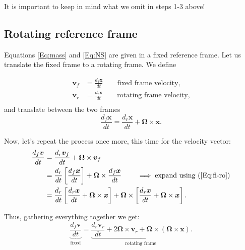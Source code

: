 It is important to keep in mind what we omit in steps 1-3 above!

\subsection{Rotating reference frame}
Equations \ref{Eq:mass} and \ref{Eq:NS} are given in a fixed reference frame. Let us translate the fixed frame to a rotating frame. We define

\begin{equation}
\begin{aligned}
\boldsymbol{v}_f &= \frac{d_f\boldsymbol{x}}{dt} \qquad \text{fixed frame velocity,}\\
\boldsymbol{v}_r &= \frac{d_r\boldsymbol{x}}{dt} \qquad \text{rotating frame velocity,}\\
\end{aligned}
\end{equation}
and translate between the two frames
\begin{equation}
\frac{d_f\boldsymbol{x}}{dt} = \frac{d_r\boldsymbol{x}}{dt} + \boldsymbol{\Omega} \times \boldsymbol{x}.
\label{Eq:fi-ro}
\end{equation}

Now, let's repeat the process once more, this time for the velocity vector:
\begin{equation}
\begin{aligned}
\frac{d_f\boldsymbol{v}}{dt} &= \frac{d_r\boldsymbol{v}_f}{dt} + \boldsymbol{\Omega} \times \boldsymbol{v}_f\\
& = \frac{d_r}{dt}\left[\frac{d_f\boldsymbol{x}}{dt}\right]+ \boldsymbol{\Omega} \times \frac{d_f\boldsymbol{x}}{dt} \qquad \implies \text{expand using } (\ref{Eq:fi-ro}) \\
& = \frac{d_r}{dt}\left[ \frac{d_r\boldsymbol{x}}{dt} + \boldsymbol{\Omega} \times \boldsymbol{x} \right] + \boldsymbol{\Omega} \times \left[ \frac{d_r\boldsymbol{x}}{dt} + \boldsymbol{\Omega} \times \boldsymbol{x}  \right].
\end{aligned}
\end{equation}


Thus, gathering everything together we get:
\begin{equation}
\underbrace{\frac{d_f\boldsymbol{v}}{dt} }_{\text{fixed}} = \underbrace{\frac{d_r\boldsymbol{v}_r}{dt} + 2\boldsymbol{\Omega} \times \boldsymbol{v}_r + \boldsymbol{\Omega}\times (\boldsymbol{\Omega} \times \boldsymbol{x})}_{\text{rotating frame}}.
\end{equation}

